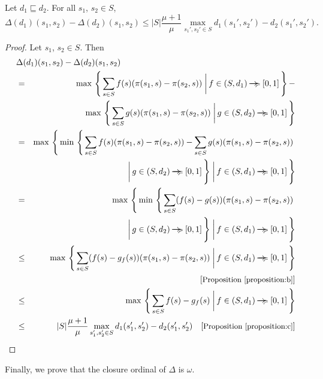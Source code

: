 \documentclass{LMCS}
\newcommand{\ndi}{\mathbin{\raisebox{0.15ex}{-\hspace{-0.2em}-\hspace{-0.2em}-\hspace{-0.2em}-\hspace{-0.2em}-\hspace{-0.2em}-}\hspace{-0.7em}\succcurlyeq}}
\newcommand{\comment}[1]{\hspace{1em}\mbox{[{\small #1}]}}
\newcommand{\bigmid}{\; \bigg| \,}
\begin{document}
\begin{prop}
\label{proposition:d}
Let $d_1 \sqsubseteq d_2$.
For all $s_1$, $s_2 \in S$,
\begin{displaymath}
\Delta(d_1)(s_1, s_2) - \Delta(d_2)(s_1, s_2) 
\leq
|S| \frac{\mu + 1}{\mu} \max_{s_1', s_2' \in S} d_1(s_1', s_2') - d_2(s_1', s_2').
\end{displaymath}
\end{prop}
\begin{proof}
Let $s_1$, $s_2 \in S$.  Then
\begin{eqnarray*}
\lefteqn{\Delta(d_1)(s_1, s_2) - \Delta(d_2)(s_1, s_2)}\\
& = & \max\, \left \{\, \sum_{s \in S} f(s) (\pi(s_1, s) - \pi(s_2, s)) \bigmid f \in (S, d_1) \ndi [0, 1] \, \right \}
      -\\
&   & \max\, \left \{\, \sum_{s \in S} g(s) (\pi(s_1, s) - \pi(s_2, s)) \bigmid g \in (S, d_2) \ndi [0, 1] \, \right \}\\
& = & \max\, \left \{\, \min\, \left \{\, \sum_{s \in S} f(s) (\pi(s_1, s) - \pi(s_2, s)) - \sum_{s \in S} g(s) (\pi(s_1, s) - \pi(s_2, s)) \right . \right .\\
&   & \phantom{\max\, \left \{\, \min\, \left \{\, \right. \right .} \bigmid g \in (S, d_2) \ndi [0, 1] \,\Bigg\} \bigmid f \in (S, d_1) \ndi [0, 1] \,\Bigg\}\\
& = & \max\, \left \{\, \min\, \left \{\, \sum_{s \in S} (f(s) - g(s)) (\pi(s_1, s) - \pi(s_2, s)) \right . \right . \\
&   & \phantom{\max\, \left \{\, \min\, \left \{\, \right. \right .} \bigmid g \in (S, d_2) \ndi [0, 1] \,\Bigg\} \bigmid f \in (S, d_1) \ndi [0, 1] \,\Bigg\}\\
& \leq & \max\, \left \{\, \sum_{s \in S} (f(s) - g_f(s)) (\pi(s_1, s) - \pi(s_2, s)) \bigmid f \in (S, d_1) \ndi [0, 1] \, \right \}\\
&& \comment{Proposition~\ref{proposition:b}}\\
& \leq & \max\, \left \{\, \sum_{s \in S} f(s) - g_f(s) \bigmid f \in (S, d_1) \ndi [0, 1] \, \right \}\\
& \leq & |S| \frac{\mu + 1}{\mu} \max_{s_1', s_2' \in S} d_1(s_1', s_2') - d_2(s_1', s_2')
\comment{Proposition~\ref{proposition:c}}
\end{eqnarray*}
\end{proof}

Finally, we prove that the closure ordinal of $\Delta$ is $\omega$.
\end{document}
